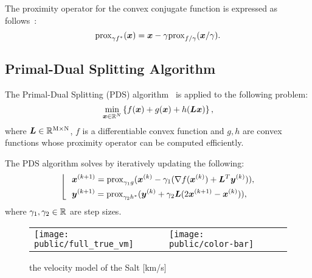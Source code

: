The proximity operator for the convex conjugate function is expressed as follows~\cite[Theorem 3.1 (ii)]{prox-convex-conjugate-function}:
\begin{equation} \label{eq:ProximityOperatorDefinitionWithConvexConjugateFunctionEq} \mathrm{prox}_{ \gamma f^* }(\bm{x}) = \bm{x} - \gamma \mathrm{prox}_{ f / \gamma }(\bm{x} / \gamma). \end{equation}


\subsection{Primal-Dual Splitting Algorithm}\label{subsec:primal-dual-splitting-algorithm}
The Primal-Dual Splitting (PDS) algorithm~\cite{PDS0,PDS1,PDS2,PDS3} is applied to the following problem:
\begin{equation} \label{eq:PDSPrimalEq} \underset{ \bm{x} \in \mathbb{R}^N }{\mathrm{min}} \left\{ f(\bm{x}) + g(\bm{x}) + h(\bm{L} \bm{x}) \right\}, \end{equation}
where $\bm{L} \in \mathbb{R}^{\mathrm{M} \times \mathrm{N}}$, $f$ is a differentiable convex function and $g,h$ are convex functions whose proximity operator can be computed efficiently.

The PDS algorithm solves by iteratively updating the following:
\begin{equation} \label{eq:PDSSubStep} \left \lfloor \ \ \begin{aligned} & \bm{x}^{(k+1)} = \mathrm{prox}_{\gamma_1 g}(\bm{x}^{(k)} - \gamma_1( \nabla f(\bm{x}^{(k)}) + \bm{L}^T \bm{y}^{(k)} )), \\ & \bm{y}^{(k+1)} = \mathrm{prox}_{\gamma_2 h^*}(\bm{y}^{(k)} + \gamma_2 \bm{L} (2\bm{x}^{(k+1)} - \bm{x}^{(k)}) ), \\ \end{aligned} \right. \end{equation}
where $\gamma_1, \gamma_2 \in \mathbb{R}$ are step sizes.


\begin{figure*}[htbp]
    \centering
    \begin{tabular}{m{144mm} m{10mm} m{0mm}}
        \begin{minipage}[b]{146mm}
            \centering
            \texttt{[image: public/full\_true\_vm]}
        \end{minipage} &
        \begin{minipage}[b]{20mm}
            \centering
            \texttt{[image: public/color-bar]}
        \end{minipage} &
    \end{tabular}
    \caption{the velocity model of the Salt [km/s]}
    \label{fig:salt-model}
\end{figure*}




